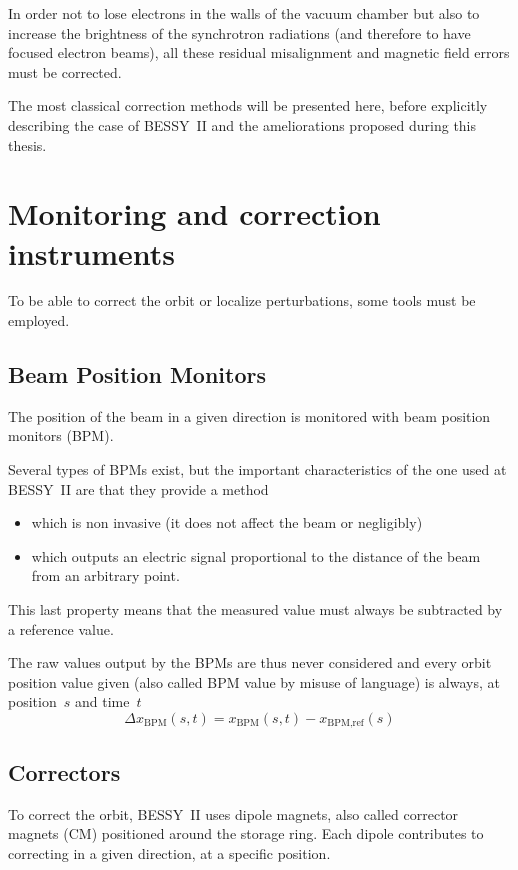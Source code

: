 In order not to lose electrons in the walls of the vacuum chamber but also to increase the brightness of the synchrotron radiations (and therefore to have focused electron beams), all these residual misalignment and magnetic field errors must be corrected.

The most classical correction methods will be presented here, before explicitly describing the case of BESSY~II and the ameliorations proposed during this thesis.

\section{Monitoring and correction instruments}
To be able to correct the orbit or localize perturbations, some tools must be employed.

\subsection{Beam Position Monitors}
The position of the beam in a given direction is monitored with beam position monitors (BPM).

Several types of BPMs exist, but the important characteristics of the one used at BESSY~II are that they provide a method
\begin{itemize}
	\item which is non invasive (it does not affect the beam or negligibly)
	\item which outputs an electric signal proportional to the distance of the beam from an arbitrary point.
\end{itemize}

This last property means that the measured value must always be subtracted by a reference value.

The raw values output by the BPMs are thus never considered and every orbit position value given (also called BPM value by misuse of language) is always, at position~$s$ and time~$t$
\begin{equation}
\Delta x_\text{BPM}(s,t) = x_\text{BPM}(s,t) - x_\text{BPM,ref}(s)
\end{equation}

\subsection{Correctors}
To correct the orbit, BESSY~II uses dipole magnets, also called corrector magnets (CM) positioned around the storage ring. Each dipole contributes to correcting in a given direction, at a specific position.

